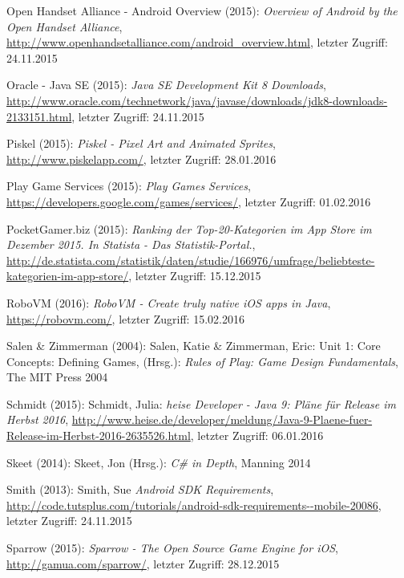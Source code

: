 \begin{thebibliography}{}
Open Handset Alliance - Android Overview (2015): \emph{Overview of Android by the Open Handset Alliance},
\url{http://www.openhandsetalliance.com/android_overview.html}, letzter Zugriff: 24.11.2015

Oracle - Java SE (2015): \emph{Java SE Development Kit 8 Downloads},
\url{http://www.oracle.com/technetwork/java/javase/downloads/jdk8-downloads-2133151.html}, letzter Zugriff: 24.11.2015

Piskel (2015): \emph{Piskel - Pixel Art and Animated Sprites},
\url{http://www.piskelapp.com/}, letzter Zugriff: 28.01.2016

Play Game Services (2015): \emph{Play Games Services},
\url{https://developers.google.com/games/services/}, letzter Zugriff: 01.02.2016

PocketGamer.biz (2015): \emph{Ranking der Top-20-Kategorien im App Store im Dezember 2015. In Statista - Das Statistik-Portal.},
\url{http://de.statista.com/statistik/daten/studie/166976/umfrage/beliebteste-kategorien-im-app-store/}, letzter Zugriff: 15.12.2015

RoboVM (2016): \emph{RoboVM - Create truly native iOS apps in Java},
\url{https://robovm.com/}, letzter Zugriff: 15.02.2016

Salen \& Zimmerman (2004): Salen, Katie \& Zimmerman, Eric: 
\glqq Unit 1: Core Concepts: Defining Games\grqq, 
(Hrsg.): \emph{Rules of Play: Game Design Fundamentals}, The MIT Press 2004

Schmidt (2015): Schmidt, Julia: \emph{heise Developer - Java 9: Pläne für Release im Herbst 2016},
\url{http://www.heise.de/developer/meldung/Java-9-Plaene-fuer-Release-im-Herbst-2016-2635526.html}, letzter Zugriff: 06.01.2016

Skeet (2014): Skeet, Jon (Hrsg.): 
\emph{C\# in Depth}, Manning 2014

Smith (2013): Smith, Sue \emph{Android SDK Requirements},
\url{http://code.tutsplus.com/tutorials/android-sdk-requirements--mobile-20086}, letzter Zugriff: 24.11.2015

Sparrow (2015): \emph{Sparrow - The Open Source Game Engine for iOS},
\url{http://gamua.com/sparrow/}, letzter Zugriff: 28.12.2015


\end{thebibliography}
